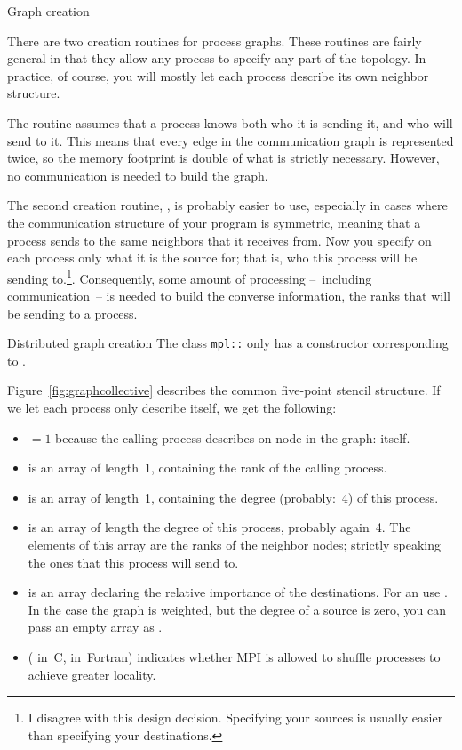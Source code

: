  {Graph creation}

There are two creation routines for process graphs. These routines are
fairly general in that they allow any process to specify any part of
the topology. In practice, of course, you will mostly let each process
describe its own neighbor structure.

The routine  assumes that a process
knows both who it is sending it, and who will send to it. This means
that every edge in the communication graph is represented twice, so
the memory footprint is double of what is strictly necessary. However,
no communication is needed to build the graph.

The second creation routine, , is
probably easier to use, especially in cases where the communication
structure of your program is symmetric, meaning that a process sends
to the same neighbors that it receives from.  Now you specify on each
process only what it is the source for; that is, who this process will
be sending to.\footnote{I disagree with this design
  decision. Specifying your sources is usually easier than specifying
  your destinations.}. Consequently, some amount of processing
--~including communication~-- is needed to build the converse
information, the ranks that will be sending to a process.

\begin{mplnote}{Distributed graph creation}
  The class \lstinline+mpl::+
  only has a constructor corresponding to .
\end{mplnote}

Figure~\ref{fig:graphcollective} describes the common five-point
stencil structure. If we let each process only describe itself, we get
the following:
\begin{itemize}
\item {}$=1$ because the calling process describes on node
  in the graph: itself.
\item {} is an array of length~1, containing the rank of the
  calling process.
\item {} is an array of length~1, containing the degree
  (probably:~4) of this process.
\item {} is an array of length the degree of this
  process, probably again~4. The elements of this array are the ranks
  of the neighbor nodes; strictly speaking the ones that this process
  will send to.
\item {} is an array declaring the relative importance of the
  destinations. For an  use
  .
  In the case the graph is weighted, but the degree of a source is zero, you can pass
  an empty array as .
\item {} ( in~C,  in~Fortran) indicates
  whether MPI is allowed to shuffle processes to achieve greater locality.
\end{itemize}


